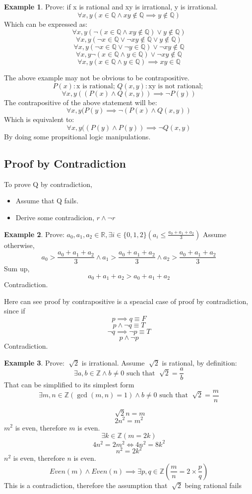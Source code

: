 \documentclass[14pt]{article}
\theoremstyle{definition}
\newtheorem*{example}{Example}
\begin{document}
\begin{example}
    Prove: if x is rational and xy is irrational, y is irrational.
    \[\forall x, y(x \in \mathbb{Q} \land xy \notin \mathbb{Q} \implies y \notin \mathbb{Q})\]
    Which can be expressed as:
    \[\forall x, y(\neg(x \in \mathbb{Q} \land xy \notin \mathbb{Q}) \lor y \notin \mathbb{Q})\]
    \[\forall x, y(\neg x \in \mathbb{Q} \lor \neg xy \notin \mathbb{Q} \lor y \notin \mathbb{Q})\]
    \[\forall x, y(\neg x \in \mathbb{Q} \lor \neg y \in \mathbb{Q}) \lor \neg xy \notin \mathbb{Q}\]
    \[\forall x, y\neg (x \in \mathbb{Q} \land y \in \mathbb{Q}) \lor \neg xy \notin \mathbb{Q}\]
    \[\forall x, y(x \in \mathbb{Q} \land y \in \mathbb{Q}) \implies xy \in \mathbb{Q}\]
\end{example}
The above example may not be obvious to be contrapositive.
\[P(x): \text{x is rational; } Q(x, y): \text{xy is not rational; } \]
\[\forall x, y ((P(x)\land Q(x,y)) \implies \neg P(y))\]
The contrapositive of the above statement will be: 
\[\forall x, y (P(y) \implies \neg(P(x)\land Q(x,y))\]
Which is equivalent to:
\[\forall x, y ((P(y) \land P(y)) \implies \neg Q(x,y)\]
By doing some propsitional logic manipulations.
\subsection{Proof by Contradiction}
To prove Q by contradiction,
\begin{itemize}
    \item Assume that Q fails.
    \item Derive some contradicion, \(r \land \neg r\)
\end{itemize}
\begin{example}
    Prove: \(a_0, a_1, a_2 \in \mathbb{R}, \exists i \in \{0, 1, 2\} (a_i \leq \frac{a_0 + a_1 + a_2}{3})\)
    Assume otherwise, 
    \[a_0 > \frac{a_0 + a_1 + a_2}{3} \land a_1 > \frac{a_0 + a_1 + a_2}{3} \land a_2 > \frac{a_0 + a_1 + a_2}{3}\]
    Sum up, 
    \[a_0 + a_1 + a_2 > a_0 + a_1 + a_2\]
    Contradiction. 
\end{example}
Here can see proof by contrapositive is a speacial case of proof by contradiction, since if 
\[p \implies q \equiv F\]
\[p \land \neg q \equiv T\]
\[\neg q \implies \neg p \equiv T\]
\[p \land \neg p\]
Contradiction.

\begin{example}
    Prove: \(\sqrt[]{2}\) is irrational.
    Assume \(\sqrt[]{2}\) is rational, by definition:
    \[\exists a, b \in \mathbb{Z} \land b \neq 0 \text{ such that }\sqrt[]{2} = \frac{a}{b}\]
    That can be simplified to its simplest form 
    \[\exists m, n \in \mathbb{Z}(\gcd(m, n) = 1) \land b \neq 0 \text{ such that }\sqrt[]{2} = \frac{m}{n}\]
    
    \[\sqrt[]{2}n = m\]
    \[2n^2 = m^2\]
    \(m^2\) is even, therefore \(m\) is even. 
    \[\exists k \in \mathbb{Z}(m = 2k)\]
    \[4n^2 = 2m^2 \iff 4n^2 = 8k^2\]
    \[n^2 = 2k^2\]
    \(n^2\) is even, therefore \(n\) is even. 
    \[Even(m) \land Even(n) \implies \exists p, q \in \mathbb{Z} (\frac{m}{n} = 2 \times \frac{p}{q})\]
    This is a contradiction, therefore the assumption that \(\sqrt[]{2}\) being rational fails
\end{example}
\end{document}
